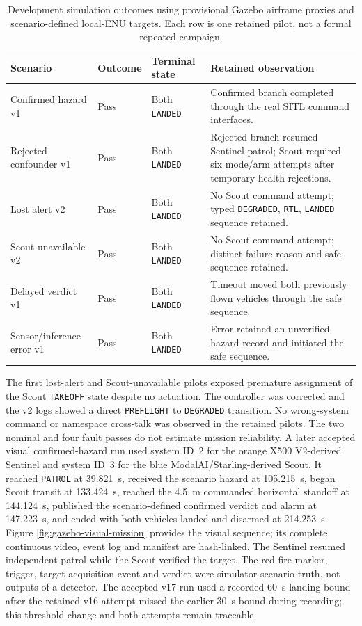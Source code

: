 \begin{table}[H]
  \centering
  \caption{Development simulation outcomes using provisional Gazebo airframe
  proxies and scenario-defined local-ENU targets. Each row is one retained
  pilot, not a formal repeated campaign.}
  \label{tab:simulation-development-results}
  \scriptsize
  \begin{tabularx}{\textwidth}{@{}p{}p{}p{}X@{}}
    \toprule
    Scenario & Outcome & Terminal state & Retained observation \\
    \midrule
    Confirmed hazard v1 & Pass & Both \texttt{LANDED} & Confirmed branch completed through the real SITL command interfaces. \\
    Rejected confounder v1 & Pass & Both \texttt{LANDED} & Rejected branch resumed Sentinel patrol; Scout required six mode/arm attempts after temporary health rejections. \\
    Lost alert v2 & Pass & Both \texttt{LANDED} & No Scout command attempt; typed \texttt{DEGRADED}, \texttt{RTL}, \texttt{LANDED} sequence retained. \\
    Scout unavailable v2 & Pass & Both \texttt{LANDED} & No Scout command attempt; distinct failure reason and safe sequence retained. \\
    Delayed verdict v1 & Pass & Both \texttt{LANDED} & Timeout moved both previously flown vehicles through the safe sequence. \\
    Sensor/inference error v1 & Pass & Both \texttt{LANDED} & Error retained an unverified-hazard record and initiated the safe sequence. \\
    \bottomrule
  \end{tabularx}
\end{table}

The first lost-alert and Scout-unavailable pilots exposed premature assignment
of the Scout \texttt{TAKEOFF} state despite no actuation. The controller was
corrected and the v2 logs showed a direct \texttt{PREFLIGHT} to
\texttt{DEGRADED} transition. No wrong-system command or namespace cross-talk
was observed in the retained pilots. The two nominal and four fault passes do
not estimate mission reliability. A later accepted visual confirmed-hazard run
used system ID~2 for the orange X500 V2-derived Sentinel and system ID~3 for the
blue ModalAI/Starling-derived Scout. It reached \texttt{PATROL} at 39.821~s,
received the scenario hazard at 105.215~s, began Scout transit at 133.424~s,
reached the 4.5~m commanded horizontal standoff at 144.124~s, published the
scenario-defined confirmed verdict and alarm at 147.223~s, and ended with both
vehicles landed and disarmed at 214.253~s. Figure
\ref{fig:gazebo-visual-mission} provides the visual sequence; its complete
continuous video, event log and manifest are hash-linked. The Sentinel resumed
independent patrol while the Scout verified the target. The red fire marker,
trigger, target-acquisition event and verdict were simulator scenario truth,
not outputs of a detector. The accepted v17 run used a recorded 60~s landing
bound after the retained v16 attempt missed the earlier 30~s bound during
recording; this threshold change and both attempts remain traceable.

